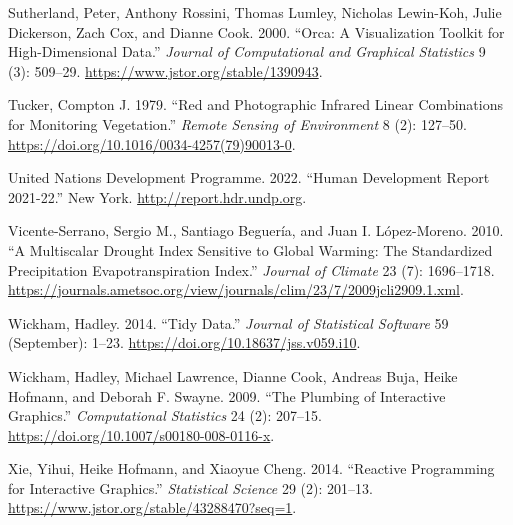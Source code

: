 \documentclass[
]{article}
\newlength{\cslhangindent}
\newlength{\cslentryspacingunit} %
\newenvironment{CSLReferences}[2] %
 {%
  \setlength{\parindent}{0pt}
  \ifodd #1
  \let\oldpar\par
  \def\par{\hangindent=\cslhangindent\oldpar}
  \fi
  \setlength{\parskip}{#2\cslentryspacingunit}
 }%
 {}
\begin{document}
\begin{CSLReferences}{1}{0}
\leavevmode{}%
Sutherland, Peter, Anthony Rossini, Thomas Lumley, Nicholas Lewin-Koh,
Julie Dickerson, Zach Cox, and Dianne Cook. 2000. {``Orca: {A}
{Visualization} {Toolkit} for {High}-{Dimensional} {Data}.''}
\emph{Journal of Computational and Graphical Statistics} 9 (3): 509--29.
\url{https://www.jstor.org/stable/1390943}.

\leavevmode{}%
Tucker, Compton J. 1979. {``Red and Photographic Infrared Linear
Combinations for Monitoring Vegetation.''} \emph{Remote Sensing of
Environment} 8 (2): 127--50.
\url{https://doi.org/10.1016/0034-4257(79)90013-0}.

\leavevmode{}%
United Nations Development Programme. 2022. {``Human Development Report
2021-22.''} New York. \url{http://report.hdr.undp.org}.

\leavevmode{}%
Vicente-Serrano, Sergio M., Santiago Beguería, and Juan I. López-Moreno.
2010. {``A {Multiscalar} {Drought} {Index} {Sensitive} to {Global}
{Warming}: {The} {Standardized} {Precipitation} {Evapotranspiration}
{Index}.''} \emph{Journal of Climate} 23 (7): 1696--1718.
\url{https://journals.ametsoc.org/view/journals/clim/23/7/2009jcli2909.1.xml}.

\leavevmode{}%
Wickham, Hadley. 2014. {``Tidy {Data}.''} \emph{Journal of Statistical
Software} 59 (September): 1--23.
\url{https://doi.org/10.18637/jss.v059.i10}.

\leavevmode{}%
Wickham, Hadley, Michael Lawrence, Dianne Cook, Andreas Buja, Heike
Hofmann, and Deborah F. Swayne. 2009. {``The Plumbing of Interactive
Graphics.''} \emph{Computational Statistics} 24 (2): 207--15.
\url{https://doi.org/10.1007/s00180-008-0116-x}.

\leavevmode{}%
Xie, Yihui, Heike Hofmann, and Xiaoyue Cheng. 2014. {``Reactive
{Programming} for {Interactive} {Graphics}.''} \emph{Statistical
Science} 29 (2): 201--13.
\url{https://www.jstor.org/stable/43288470?seq=1}.

\end{CSLReferences}
\end{document}
